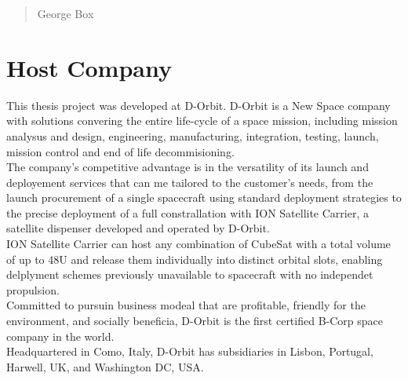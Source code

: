 \begin{quotation}
{\footnotesize
{}
\begin{flushright}
George Box
\end{flushright}
}
\end{quotation}
\vspace{0.5cm}

\section{Host Company}
This thesis project was developed at D-Orbit.
D-Orbit is a New Space company with solutions convering the entire life-cycle of a space mission, including mission analysus and design, engineering, manufacturing, integration, testing, launch, mission control and end of life decommisioning.\\
The company's competitive advantage is in the versatility of its launch and deployement services that can me tailored to the customer's needs, from the launch procurement of a single spacecraft using standard deployment strategies to the precise deployment of a full constrallation with ION Satellite Carrier, a satellite dispenser developed and operated by D-Orbit.\\
ION Satellite Carrier can host any combination of CubeSat with a total volume of up to 48U and release them individually into distinct orbital slots, enabling delplyment schemes previously unavailable to spacecraft with no independet propulsion.\\
Committed to pursuin business modeal that are profitable, friendly for the environment, and socially beneficia, D-Orbit is the first certified B-Corp space company in the world.\\
Headquartered in Como, Italy, D-Orbit has subsidiaries in Lisbon, Portugal, Harwell, UK, and Washington DC, USA.\\

